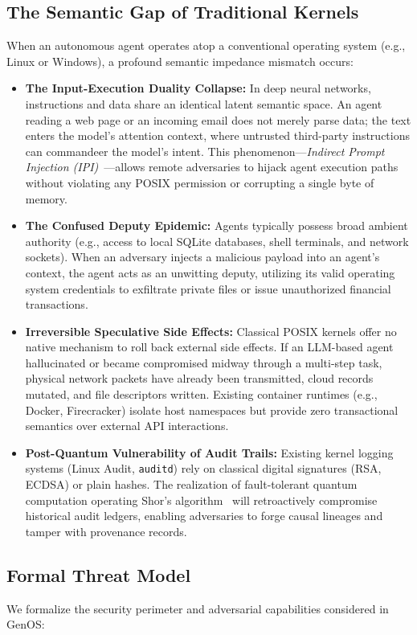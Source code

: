 \documentclass[10pt,journal,compsoc]{IEEEtran}
\theoremstyle{definition}
\begin{document}
\subsection{The Semantic Gap of Traditional Kernels}
When an autonomous agent operates atop a conventional operating system (e.g., Linux or Windows), a profound semantic impedance mismatch occurs:
\begin{itemize}
    \item \textbf{The Input-Execution Duality Collapse:} In deep neural networks, instructions and data share an identical latent semantic space. An agent reading a web page or an incoming email does not merely parse data; the text enters the model's attention context, where untrusted third-party instructions can commandeer the model's intent. This phenomenon—\textit{Indirect Prompt Injection (IPI)}~\cite{greshake2023not}—allows remote adversaries to hijack agent execution paths without violating any POSIX permission or corrupting a single byte of memory.
    \item \textbf{The Confused Deputy Epidemic:} Agents typically possess broad ambient authority (e.g., access to local SQLite databases, shell terminals, and network sockets). When an adversary injects a malicious payload into an agent's context, the agent acts as an unwitting deputy, utilizing its valid operating system credentials to exfiltrate private files or issue unauthorized financial transactions.
    \item \textbf{Irreversible Speculative Side Effects:} Classical POSIX kernels offer no native mechanism to roll back external side effects. If an LLM-based agent hallucinated or became compromised midway through a multi-step task, physical network packets have already been transmitted, cloud records mutated, and file descriptors written. Existing container runtimes (e.g., Docker, Firecracker) isolate host namespaces but provide zero transactional semantics over external API interactions.
    \item \textbf{Post-Quantum Vulnerability of Audit Trails:} Existing kernel logging systems (Linux Audit, \texttt{auditd}) rely on classical digital signatures (RSA, ECDSA) or plain hashes. The realization of fault-tolerant quantum computation operating Shor's algorithm~\cite{shor1994algorithms} will retroactively compromise historical audit ledgers, enabling adversaries to forge causal lineages and tamper with provenance records.
\end{itemize}

\subsection{Formal Threat Model}
We formalize the security perimeter and adversarial capabilities considered in GenOS:
\end{document}
